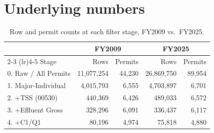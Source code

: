 \documentclass[11pt]{article}
\begin{document}
\section*{Underlying numbers}

\begin{table}[h!]
\centering
\begin{tabular}{lrrrr}
\toprule
 & \multicolumn{2}{c}{FY2009} & \multicolumn{2}{c}{FY2025} \\
\cmidrule(lr){2-3} \cmidrule(lr){4-5}
Stage & Rows & Permits & Rows & Permits \\
\midrule
0. Raw / All Permits  & 11{,}077{,}254 & 44{,}230 & 26{,}869{,}750 & 89{,}954 \\
1. Major-Individual   & 4{,}015{,}793 & 6{,}555 & 4{,}703{,}897 & 6{,}701 \\
2. +TSS (00530)        &   440{,}369 & 6{,}426 &   489{,}033 & 6{,}572 \\
3. +Effluent Gross     &   328{,}296 & 6{,}091 &   336{,}437 & 6{,}117 \\
4. +C1/Q1              &    80{,}196 & 4{,}974 &    75{,}818 & 4{,}880 \\
\bottomrule
\end{tabular}
\caption{Row and permit counts at each filter stage, FY2009 vs.\ FY2025.}
\label{tab:funnel}
\end{table}
\end{document}
